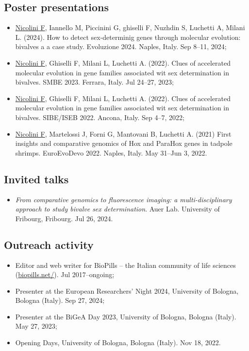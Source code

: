 \subsection*{Poster presentations}
\begin{itemize}
    \item \underline{Nicolini F}, Iannello M, Piccinini G, ghiselli F, Nuzhdin S, Luchetti A, Milani L. (2024). How to detect sex-determinig genes through molecular evolution: bivalves a a case study. Evoluzione 2024. Naples, Italy. Sep 8--11, 2024;
    \item \underline{Nicolini F}, Ghiselli F, Milani L, Luchetti A. (2022). Clues of accelerated molecular evolution in gene families associated wit sex determination in bivalves. SMBE 2023. Ferrara, Italy. Jul 24--27, 2023;
    \item \underline{Nicolini F}, Ghiselli F, Milani L, Luchetti A. (2022). Clues of accelerated molecular evolution in gene families associated wit sex determination in bivalves. SIBE/ISEB 2022. Ancona, Italy. Sep 4--7, 2022;
    \item \underline{Nicolini F}, Martelossi J, Forni G, Mantovani B, Luchetti A. (2021) First insights and comparative genomics of Hox and ParaHox genes in tadpole shrimps. EuroEvoDevo 2022. Naples, Italy. May 31--Jun 3, 2022.
\end{itemize}

\subsection*{Invited talks}
\begin{itemize}
    \item \textit{From comparative genomics to fluorescence imaging: a multi-disciplinary approach to study bivalve sex determination}. Auer Lab. University of Fribourg, Fribourg. Jul 26, 2024.
\end{itemize}

\subsection*{Outreach activity}
\begin{itemize}
    \item Editor and web writer for BioPills -- the Italian community of life sciences (\href{https://biopills.net/}{biopills.net/}). Jul 2017--ongoing;
    \item Presenter at the European Researchers' Night 2024, University of Bologna, Bologna (Italy). Sep 27, 2024;
    \item Presenter at the BiGeA Day 2023, University of Bologna, Bologna (Italy). May 27, 2023;
    \item Opening Days, University of Bologna, Bologna (Italy). Nov 18, 2022.
\end{itemize}

